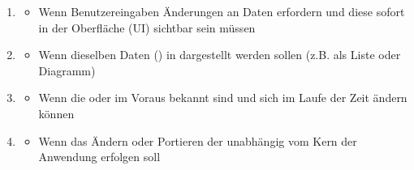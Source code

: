 \begin{infoBox}[title=Wann sollte MVC verwendet werden?]
    \begin{enumerate}
        \item {}
        \begin{itemize}
            \item Wenn Benutzereingaben Änderungen an Daten erfordern und diese sofort in der Oberfläche (UI) sichtbar sein müssen
        \end{itemize}
        \item {}
        \begin{itemize}
            \item Wenn dieselben Daten () in  dargestellt werden sollen (z.B. als Liste oder Diagramm)
        \end{itemize}
        \item {}
        \begin{itemize}
            \item Wenn die  oder im Voraus bekannt sind und sich im Laufe der Zeit ändern können
        \end{itemize}
        \item {}
        \begin{itemize}
            \item Wenn das Ändern oder Portieren der  unabhängig vom Kern der Anwendung erfolgen soll
        \end{itemize}
    \end{enumerate}
\end{infoBox}
